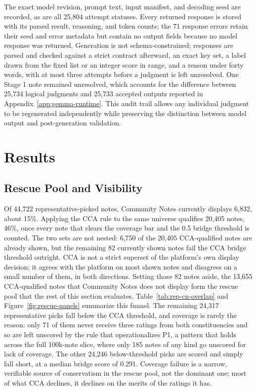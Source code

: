\documentclass[10pt,twocolumn]{article}
\begin{document}
The exact model revision, prompt text, input manifest, and decoding seed are
recorded, as are all 25,804 attempt statuses. Every returned response is stored
with its parsed result, reasoning, and token counts; the 71 response errors
retain their seed and error metadata but contain no output fields because no
model response was returned. Generation is not schema-constrained; responses
are parsed and checked against a strict contract afterward, an exact key set, a
label drawn from the fixed list or an integer score in range, and a reason under
forty words, with at most three attempts before a judgment is left unresolved.
One Stage 1 note remained
unresolved, which accounts for the difference between 25,734 logical judgments
and 25,733 accepted outputs reported in Appendix~\ref{app:gemma-runtime}.
This audit trail allows any individual judgment to be regenerated independently
while preserving the distinction between model output and post-generation
validation.

\section{Results}
\label{sec:results}

\subsection{Rescue Pool and Visibility}

Of 44,722 representative-picked notes, Community Notes currently displays
6,832, about 15\%. Applying the CCA rule to the same universe qualifies
20,405 notes, 46\%, once every note that clears the coverage bar and the 0.5
bridge threshold is counted. The two sets are not nested: 6,750 of the
20,405 CCA-qualified notes are already shown, but the remaining 82 currently
shown notes fail the CCA bridge threshold outright. CCA is not a strict
superset of the platform's own display decision; it agrees with the platform
on most shown notes and disagrees on a small number of them, in both
directions. Setting those 82 notes aside, the 13,655 CCA-qualified notes that
Community Notes does not display form the rescue pool that the rest of this
section evaluates. Table~\ref{tab:rep-cn-overlap} and
Figure~\ref{fig:rescue-panels} summarize this funnel. The remaining 24,317
representative picks fall below the CCA threshold, and coverage is rarely
the reason: only 71 of them never receive three ratings from both
constituencies and so are left unscored by the rule that operationalizes P1,
a pattern that holds across the full 100k-note slice, where only 185 notes
of any kind go unscored for lack of coverage. The other 24,246 below-threshold
picks are scored and simply fall short, at a median bridge score of 0.291.
Coverage failure is a narrow, verifiable source of conservatism in the
rescue pool, not the dominant one; most of what CCA declines, it declines on
the merits of the ratings it has.
\end{document}
